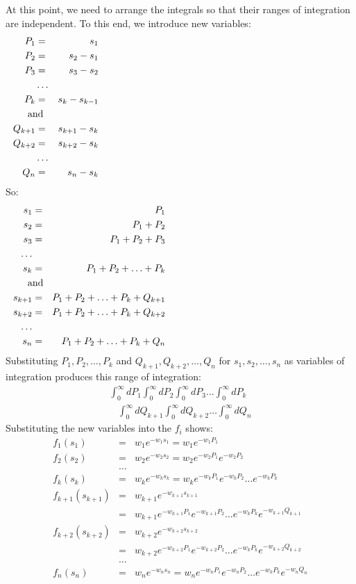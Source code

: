At this point, we need to arrange the integrals so that their ranges
of integration are independent.  To this end, we introduce new
variables:
\begin{eqnarray}
P_1 &=& s_1 \\
P_2 &=& s_2 - s_1 \nonumber \\
P_3 &=& s_3 - s_2 \nonumber \\
&\ldots& \nonumber \\
P_k &=& s_k - s_{k-1} \nonumber \\
\noalign{and}
Q_{k+1} &=& s_{k+1} - s_k \\
Q_{k+2} &=& s_{k+2} - s_k \nonumber \\
&\ldots& \nonumber \\
Q_n &=& s_n - s_k \nonumber
\end{eqnarray}
So:
\begin{eqnarray}
s_1 &=& P_1 \\
s_2 &=& P_1 + P_2 \nonumber \\
s_3 &=& P_1 + P_2 + P_3 \nonumber \\
\ldots \nonumber \\
s_k &=& P_1 + P_2 + \ldots + P_k \nonumber \\
\noalign{and}
s_{k+1} &=& P_1 + P_2 + \ldots + P_k + Q_{k+1} \\
s_{k+2} &=& P_1 + P_2 + \ldots + P_k + Q_{k+2} \nonumber \\
\ldots \nonumber \\
s_n &=& P_1 + P_2 + \ldots + P_k + Q_n \nonumber
\end{eqnarray}
Substituting $P_1, P_2, \ldots, P_k$ and $Q_{k+1}, Q_{k+2}, \ldots,
Q_n$ for $s_1, s_2, \ldots, s_n$ as variables of integration produces
this range of integration:
\begin{eqnarray}
\int_0^\infty dP_1
\int_0^\infty dP_2
\int_0^\infty dP_3
\ldots
\int_0^\infty dP_k \nonumber \\
\ \ \ \  \int_0^\infty dQ_{k+1}
\int_0^\infty dQ_{k+2} \ldots
\int_0^\infty dQ_n \nonumber
\end{eqnarray}
Substituting the new variables into  the $f_i$ shows:
\begin{eqnarray}
f_1(s_1) & = & w_1 e^{-w_1 s_1} = w_1 e^{-w_1 P_1} \nonumber \\
f_2(s_2) & = & w_2 e^{-w_2 s_2} = w_2 e^{-w_2 P_1}
e^{-w_2 P_2} \nonumber \\
&\ldots& \nonumber \\
f_k(s_k) & = & w_k e^{-w_k s_k} = w_k e^{-w_k P_1}
e^{-w_k P_2}  \ldots e^{-w_k P_k} \nonumber \\
f_{k+1}(s_{k+1}) & = & w_{k+1} e^{-w_{k+1} s_{k+1}} \nonumber \\
& = & w_{k+1} e^{-w_{k+1} P_1} e^{-w_{k+1} P_2}  \ldots e^{-w_k P_k} e^{-w_{k+1} Q_{k+1}} \nonumber \\
f_{k+2}(s_{k+2}) & = & w_{k+2} e^{-w_{k+2} s_{k+2}} \nonumber \\
& = & w_{k+2} e^{-w_{k+2} P_1}
e^{-w_{k+2} P_2}  \ldots e^{-w_k P_k} e^{-w_{k+2} Q_{k+2}} \nonumber \\
&\ldots& \nonumber \\
f_n(s_n) & = & w_n e^{-w_n s_n} = w_n e^{-w_n P_1}
e^{-w_n P_2}  \ldots e^{-w_k P_k} e^{-w_n Q_n} \nonumber
\end{eqnarray}
